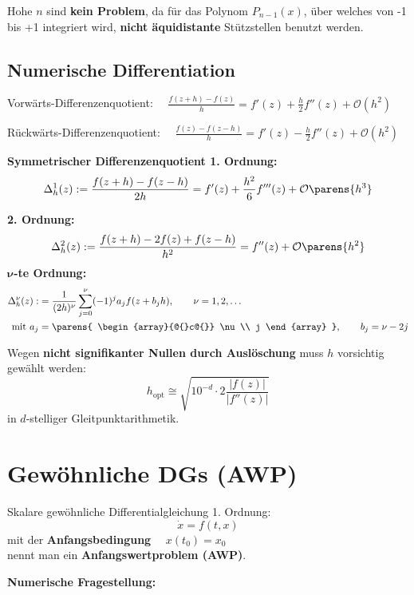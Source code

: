 			Hohe $n$ sind \textbf{kein Problem}, da für das Polynom $P_{n-1}(x)$, über welches von -1 bis +1 integriert wird, \textbf{nicht äquidistante} Stützstellen benutzt werden.

	\subsection{Numerische Differentiation}
		\label{subsec:numerische_differentiation}
		Vorwärts-Differenzenquotient: $\quad \displaystyle \frac{f(z+h) - f(z)}{h}= f'(z) + \frac{h}{2}f''(z) + \mathcal{O}\left( h^2\right) $

		Rückwärts-Differenzenquotient: $\quad\displaystyle\frac{f(z)-f(z-h)}{h}= f'(z) - \frac{h}{2}f''(z) + \mathcal{O}\left( h^2\right)$

		\textbf{Symmetrischer Differenzenquotient 1. Ordnung:}
		\[
			\Delta_h^1(z):=\frac{f(z+h)-f(z-h)}{2h}= f'(z) + \frac{h^2}{6}f'''(z) + \mathcal{O} \parens{h^3}
		\]

		\textbf{2. Ordnung:}
		\[
			\Delta_h^2(z):=\frac{f(z+h)-2f(z)+f(z-h)}{h^2}= f''(z) + \mathcal{O} \parens{ h^2 }
		\]
		$\boldsymbol{\nu}$\textbf{-te Ordnung:}
		\begin{align*}
			\Delta_h^\nu(z):&= \frac{1}{(2h)^\nu}\sum\limits_{j=0}^\nu (-1)^ja_jf(z+b_jh) ,\qquad \nu = 1,2,\dots\\
			\text{mit } a_j &= \parens{
				\begin{array}{@{}c@{}}
					\nu \\
					j
				\end{array}
			}, \qquad b_j = \nu-2j
		\end{align*}

		Wegen \textbf{nicht signifikanter Nullen durch Auslöschung} muss $h$ vorsichtig gewählt werden:
		\[
			h_\text{opt} \cong \sqrt{10^{-d}\cdot 2 \frac{|f(z)|}{|f''(z)|}}
		\]
		in $d$-stelliger Gleitpunktarithmetik.

\section{Gewöhnliche DGs (AWP)}
	Skalare gewöhnliche Differentialgleichung 1. Ordnung:
	\begin{equation}
		\dot x = f(t,x) \label{dx}
	\end{equation}
	mit der \textbf{Anfangsbedingung} $\quad x(t_0) = x_0$ \\
	nennt man ein \textbf{Anfangswertproblem (AWP)}.

	\textbf{Numerische Fragestellung:}


